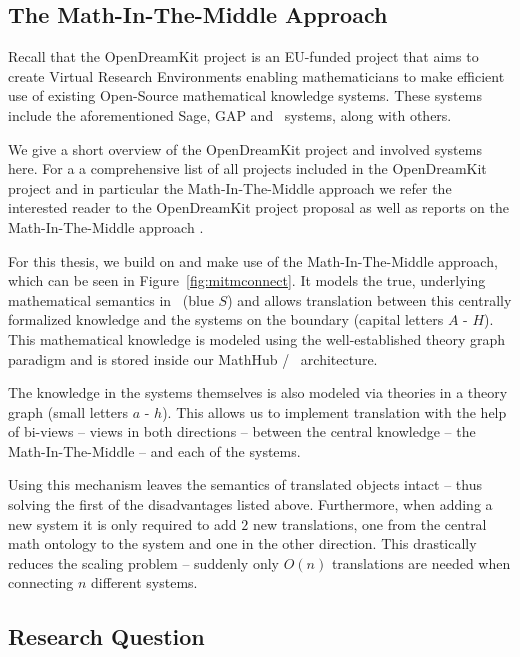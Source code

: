 \subsection{The Math-In-The-Middle Approach}\label{sec:intro:mitm}

Recall that the OpenDreamKit \cite{OpenDreamKit:on} project is an EU-funded project that aims to create Virtual Research Environments enabling mathematicians to make efficient use of existing Open-Source mathematical knowledge systems. 
These systems include the aforementioned Sage, GAP and \lmfdb\ systems, along with others. 

We give a short overview of the OpenDreamKit project and involved systems here. 
For a a comprehensive list of all projects included in the OpenDreamKit project and in particular the Math-In-The-Middle approach we refer the interested reader to the OpenDreamKit project proposal \cite{ODKproposal:on} as well as reports on the Math-In-The-Middle approach \cite{DehKohKon:iop16}.


For this thesis, we build on and make use of the Math-In-The-Middle approach, which can be seen in Figure~\ref{fig:mitmconnect}. 
It models the true, underlying mathematical semantics in \mmt\ (blue $S$) and allows translation between this centrally formalized knowledge and the systems on the boundary (capital letters $A$ - $H$).
This mathematical knowledge is modeled using the well-established theory graph paradigm and is stored inside our MathHub / \mmt\ architecture. 

The knowledge in the systems themselves is also modeled via theories in a theory graph (small letters $a$ - $h$).
This allows us to implement translation with the help of bi-views -- views in both directions -- between the central knowledge -- the Math-In-The-Middle -- and each of the systems. 

Using this mechanism leaves the semantics of translated objects intact -- thus solving the first of the disadvantages listed above. 
Furthermore, when adding a new system it is only required to add $2$ new translations, one from the central math ontology to the system and one in the other direction. 
This drastically reduces the scaling problem -- suddenly only $O(n)$ translations are needed when connecting $n$ different systems. 

\subsection{Research Question}\label{sec:intro:rq}

